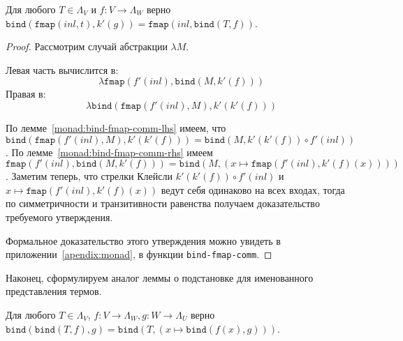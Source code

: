 \begin{lemma}
  \label{monad:bind-fmap-comm}
  Для любого $T \in \Lambda_{V}$ и $f : V \to \Lambda_{W}$ верно $\texttt{bind}(\texttt{fmap}(inl, t), k'(g)) = \texttt{fmap}(inl, \texttt{bind}(T, f))$.
\end{lemma}

\begin{proof}
  Рассмотрим случай абстракции $\lambda M$.

  Левая часть вычислится в:
  $$ \lambda \texttt{fmap}(f'(inl), \texttt{bind}(M, k'(f))) $$
  Правая в:
  $$ \lambda \texttt{bind}(\texttt{fmap}(f'(inl), M), k'(k'(f))) $$

  По лемме~\ref{monad:bind-fmap-comm-lhs} имеем, что $\texttt{bind}(\texttt{fmap}(f'(inl), M), k'(k'(f))) = \texttt{bind}(M, k'(k'(f)) \circ f'(inl))$. По лемме~\ref{monad:bind-fmap-comm-rhs} имеем $\texttt{fmap}(f'(inl), \texttt{bind}(M, k'(f))) = \texttt{bind}(M, (x \mapsto \texttt{fmap}(f'(inl), k'(f)(x))))$. Заметим теперь, что стрелки Клейсли $k'(k'(f)) \circ f'(inl)$ и $x \mapsto \texttt{fmap}(f'(inl), k'(f)(x))$ ведут себя одинаково на всех входах, тогда по симметричности и транзитивности равенства получаем доказательство требуемого утверждения.

  Формальное доказательство этого утверждения можно увидеть в приложении~\ref{apendix:monad}, в функции \texttt{bind-fmap-comm}.
\end{proof}

Наконец, сформулируем аналог леммы о подстановке для именованного представления термов.

\begin{prop}
  \label{monad:bind-assoc}
  Для любого $T \in \Lambda_{V}$, $f : V \to \Lambda_{W}, g : W \to \Lambda_{U}$ верно $\texttt{bind}(\texttt{bind}(T, f), g) = \texttt{bind}(T, (x \mapsto \texttt{bind}(f(x), g)) )$.
\end{prop}

